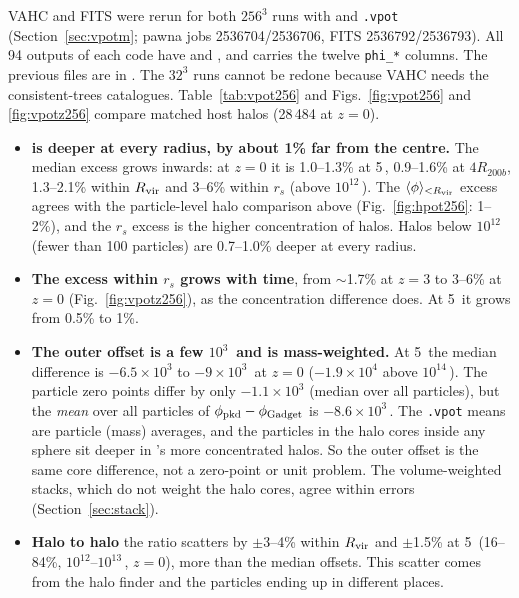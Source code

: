 VAHC and FITS were rerun for both $256^3$ runs with  and \texttt{.vpot} (Section~\ref{sec:vpotm};
pawna jobs 2536704/2536706, FITS 2536792/2536793). All 94 outputs of each code have  and , and
 carries the twelve \texttt{phi\_*} columns. The previous files are in
. The $32^3$ runs cannot be redone because VAHC needs the consistent-trees catalogues.
Table~\ref{tab:vpot256} and Figs.~\ref{fig:vpot256} and \ref{fig:vpotz256} compare matched host halos (28\,484 at $z=0$).
\begin{itemize}
\item \textbf{\pkd{} is deeper at every radius, by about 1\% far from the centre.} The median excess grows inwards:
at $z=0$ it is 1.0--1.3\% at 5\,\Mpch, 0.9--1.6\% at $4R_{200b}$, 1.3--2.1\% within $R_{\rm vir}$ and 3--6\% within
$r_s$ (above $10^{12}$\,\Msunh). The $\langle\phi\rangle_{<R_{\rm vir}}$ excess agrees with the particle-level halo
comparison above (Fig.~\ref{fig:hpot256}: 1--2\%), and the $r_s$ excess is the higher concentration of \pkd{}
halos. Halos below $10^{12}$\,\Msunh{} (fewer than 100 particles) are 0.7--1.0\% deeper at every radius.
\item \textbf{The excess within $r_s$ grows with time}, from $\sim$1.7\% at $z=3$ to 3--6\% at $z=0$
(Fig.~\ref{fig:vpotz256}), as the concentration difference does. At 5\,\Mpch{} it grows from 0.5\% to 1\%.
\item \textbf{The outer offset is a few $10^3$\,\kms{} and is mass-weighted.} At 5\,\Mpch{} the median difference
is $-6.5\times10^3$ to $-9\times10^3$\,\kms{} at $z=0$ ($-1.9\times10^4$ above $10^{14}$\,\Msunh). The particle
zero points differ by only $-1.1\times10^3$ (median over all particles), but the \emph{mean} over all particles of
$\phi_{\rm pkd}-\phi_{\rm Gadget}$ is $-8.6\times10^3$\,\kms. The \texttt{.vpot} means are particle (mass)
averages, and the particles in the halo cores inside any sphere sit deeper in \pkd{}'s more concentrated halos. So
the outer offset is the same core difference, not a zero-point or unit problem. The volume-weighted stacks,
which do not weight the halo cores, agree within errors (Section~\ref{sec:stack}).
\item \textbf{Halo to halo} the ratio scatters by $\pm$3--4\% within $R_{\rm vir}$ and $\pm$1.5\% at 5\,\Mpch{}
(16--84\%, $10^{12}$--$10^{13}$\,\Msunh, $z=0$), more than the median offsets. This scatter comes from the halo finder
and the particles ending up in different places.
\end{itemize}

